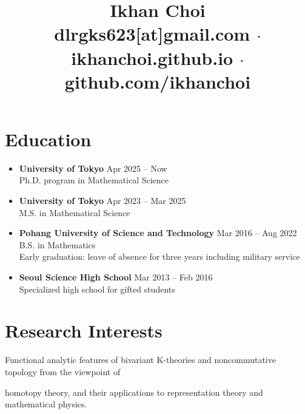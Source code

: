 \documentclass[11pt,a4paper]{article}
\title{\vspace{-40pt}
	Ikhan Choi\\[5pt]
	\small \faEnvelopeSquare\quad dlrgks623[at]gmail.com
	\quad$\cdot$\quad \faHome\quad ikhanchoi.github.io
	\quad$\cdot$\quad \faGithub\quad github.com/ikhanchoi
	\vspace{-5em}}
\date{}
\begin{document}
\maketitle


\section*{Education}
\begin{itemize}
\item
	\textbf{University of Tokyo}
	\hfill{\small Apr 2025 -- Now}\\
	Ph.D. program in Mathematical Science
\item
	\textbf{University of Tokyo}
	\hfill{\small Apr 2023 -- Mar 2025}\\
	M.S. in Mathematical Science
\item
	\textbf{Pohang University of Science and Technology}
	\hfill{\small Mar 2016 -- Aug 2022}\\
	B.S. in Mathematics\\
	Early graduation: leave of absence for three years including military service
\item
	\textbf{Seoul Science High School}
	\hfill{\small Mar 2013 -- Feb 2016}\\
	Specialized high school for gifted students
\end{itemize}



\section*{Research Interests}
\hspace{2em}
Functional analytic features of bivariant K-theories and noncommutative topology from the viewpoint of\par
\hspace{2em}
homotopy theory, and their applications to representation theory and mathematical physics.
\end{document}
